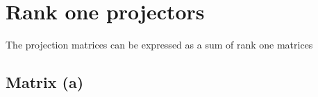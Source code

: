 \section{Rank one projectors}
The projection matrices can be expressed as a sum of rank one matrices


\subsection{Matrix (a)}

\endinput